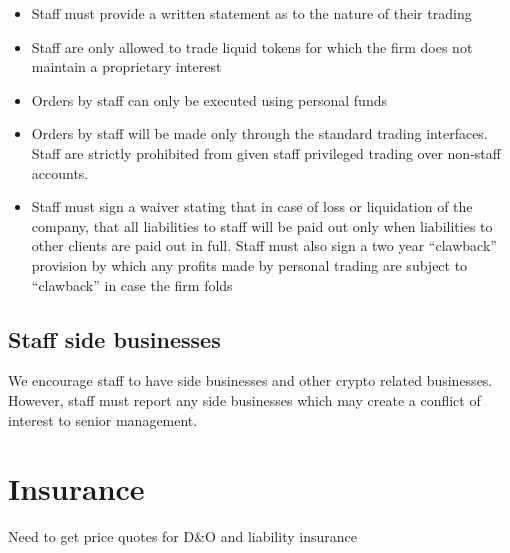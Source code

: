 \begin{itemize}
 \item Staff must provide a written statement as to the nature of
   their trading
  \item Staff are only allowed to trade liquid tokens for which the
    firm does not maintain a proprietary interest
  \item Orders by staff can only be executed using personal funds
  \item Orders by staff will be made only through the standard trading
    interfaces.  Staff are strictly prohibited from given staff
    privileged trading over non-staff accounts.
  \item Staff must sign a waiver stating that in case of loss or
    liquidation of the company, that all liabilities to staff will be
    paid out only when liabilities to other clients are paid out in
    full.  Staff must also sign a two year ``clawback'' provision by
    which any profits made by personal trading are subject to
    ``clawback'' in case the firm folds
\end{itemize}


\subsection{Staff side businesses}
We encourage staff to have side businesses and other crypto related
businesses.  However, staff must report any side businesses which may
create a conflict of interest to senior management.




\section{Insurance}

Need to get price quotes for D\&O and liability insurance
